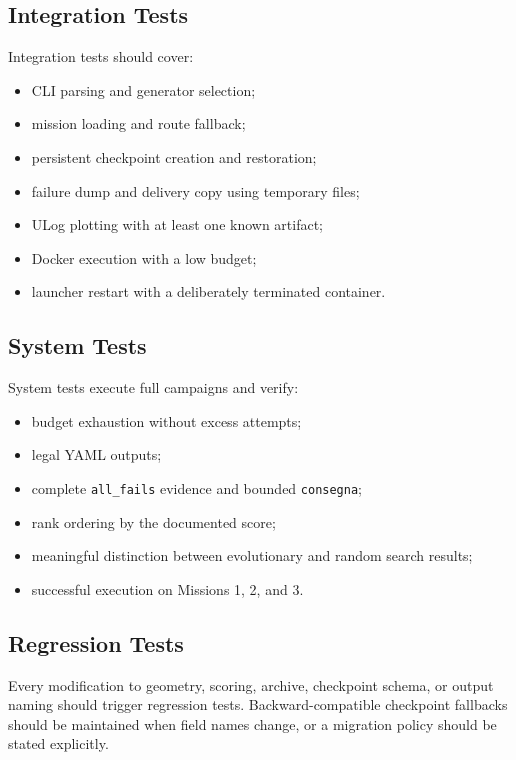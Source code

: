 \documentclass[11pt,a4paper]{report}
\newcommand{\code}[1]{\texttt{#1}}
\begin{document}
\subsection{Integration Tests}
Integration tests should cover:
\begin{itemize}
  \item CLI parsing and generator selection;
  \item mission loading and route fallback;
  \item persistent checkpoint creation and restoration;
  \item failure dump and delivery copy using temporary files;
  \item ULog plotting with at least one known artifact;
  \item Docker execution with a low budget;
  \item launcher restart with a deliberately terminated container.
\end{itemize}

\subsection{System Tests}
System tests execute full campaigns and verify:
\begin{itemize}
  \item budget exhaustion without excess attempts;
  \item legal YAML outputs;
  \item complete \code{all\_fails} evidence and bounded \code{consegna};
  \item rank ordering by the documented score;
  \item meaningful distinction between evolutionary and random search results;
  \item successful execution on Missions 1, 2, and 3.
\end{itemize}

\subsection{Regression Tests}
Every modification to geometry, scoring, archive, checkpoint schema, or output naming should trigger regression tests. Backward-compatible checkpoint fallbacks should be maintained when field names change, or a migration policy should be stated explicitly.
\end{document}
